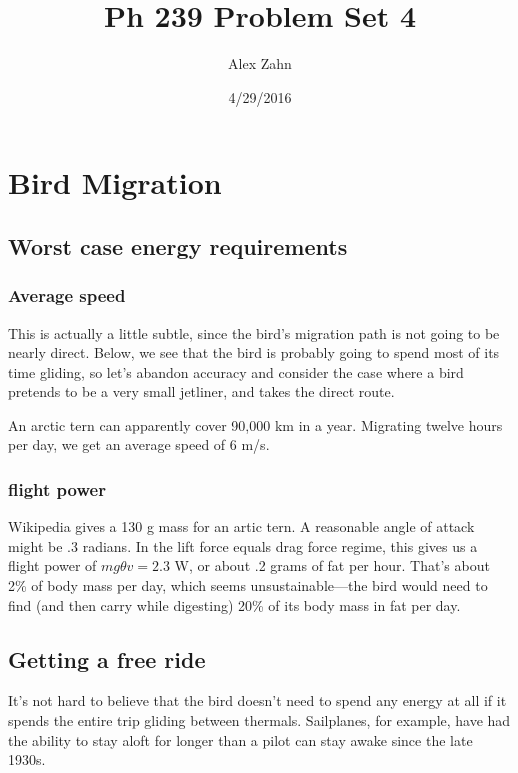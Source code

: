 \documentclass[12pt]{article}
\title{Ph 239 Problem Set 4}
\author{Alex Zahn}
\date{4/29/2016}
\begin{document}
\maketitle

\newcommand{\wmsq}{W/\(\mathrm{m}^2\,\)}
\newcommand{\msq}{\(\mathrm{m}^2\,\)}
\newcommand{\micron}{\(\mu\mathrm{m}\)\,}
\newcommand{\mcb}{\(\mathrm{m}^3\,\)}

\section{Bird Migration}

\subsection{Worst case energy requirements}

\subsubsection{Average speed}

This is actually a little subtle, since the bird's migration path is not going to be nearly direct. Below, we see that the bird is probably going to spend most of its time gliding, so let's abandon accuracy and consider the case where a bird pretends to be a very small jetliner, and takes the direct route.

An arctic tern can apparently cover 90,000 km in a year. Migrating twelve hours per day, we get an average speed of 6 m/s.

\subsubsection{flight power}

Wikipedia gives a 130 g mass for an artic tern. A reasonable angle of attack might be .3 radians. In the lift force equals drag force regime, this gives us a flight power of \(mg\theta v = 2.3\) W, or about .2 grams of fat per hour. That's about 2\% of body mass per day, which seems unsustainable---the bird would need to find (and then carry while digesting) 20\% of its body mass in fat per day. 



\subsection{Getting a free ride}

It's not hard to believe that the bird doesn't need to spend any energy at all if it spends the entire trip gliding between thermals. Sailplanes, for example, have had the ability to stay aloft for longer than a pilot can stay awake since the late 1930s.
\end{document}
